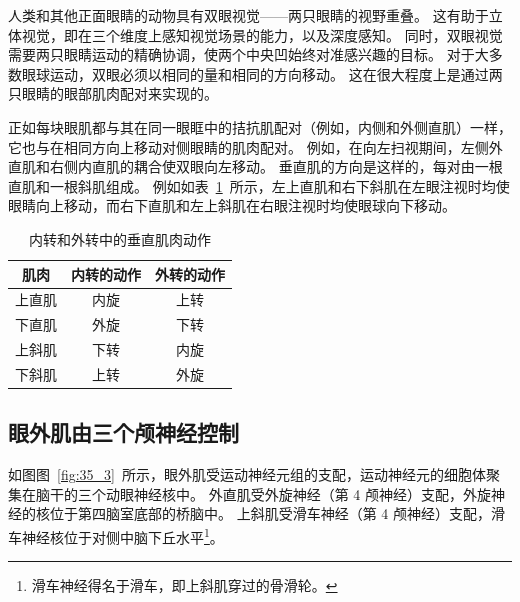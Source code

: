 人类和其他正面眼睛的动物具有双眼视觉——两只眼睛的视野重叠。
这有助于立体视觉，即在三个维度上感知视觉场景的能力，以及深度感知。
同时，双眼视觉需要两只眼睛运动的精确协调，使两个中央凹始终对准感兴趣的目标。
对于大多数眼球运动，双眼必须以相同的量和相同的方向移动。 
这在很大程度上是通过两只眼睛的眼部肌肉配对来实现的。


正如每块眼肌都与其在同一眼眶中的拮抗肌配对（例如，内侧和外侧直肌）一样，它也与在相同方向上移动对侧眼睛的肌肉配对。
例如，在向左扫视期间，左侧外直肌和右侧内直肌的耦合使双眼向左移动。
垂直肌的方向是这样的，每对由一根直肌和一根斜肌组成。
例如如表~\ref{tab:35_1}~所示，左上直肌和右下斜肌在左眼注视时均使眼睛向上移动，而右下直肌和左上斜肌在右眼注视时均使眼球向下移动。


\begin{table}[htbp]
	\caption{内转和外转中的垂直肌肉动作\label{tab:35_1}}
	\centering
	\begin{tabular}{ccc}
		\toprule
		肌肉 & 内转的动作 
		& 外转的动作 \\
		\midrule
		上直肌 & 内旋  & 上转 \\
		下直肌      & 外旋 	& 下转 \\
		上斜肌      & 下转 	& 内旋 \\
		下斜肌      & 上转 	& 外旋 \\
		\bottomrule
	\end{tabular}
\end{table}



\subsection{眼外肌由三个颅神经控制}

如图图~\ref{fig:35_3}~所示，眼外肌受运动神经元组的支配，运动神经元的细胞体聚集在脑干的三个动眼神经核中。
外直肌受外旋神经（第 4 颅神经）支配，外旋神经的核位于第四脑室底部的桥脑中。
上斜肌受滑车神经（第 4 颅神经）支配，滑车神经核位于对侧中脑下丘水平\footnote{滑车神经得名于滑车，即上斜肌穿过的骨滑轮。}。


